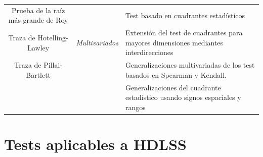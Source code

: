 \documentclass[]{book}
\begin{document}
\begin{longtable}[]{@{}ccl@{}}
\begin{minipage}[t]{0.25\columnwidth}
Prueba de la raíz más grande de Roy\strut
\end{minipage} & \begin{minipage}[t]{0.10\columnwidth}\centering\strut
\strut
\end{minipage} & \begin{minipage}[t]{0.56\columnwidth}\raggedright\strut
Test basado en cuadrantes estadísticos\strut
\end{minipage}\tabularnewline
\begin{minipage}[t]{0.25\columnwidth}\centering\strut
Traza de Hotelling-Lawley\strut
\end{minipage} & \begin{minipage}[t]{0.10\columnwidth}\centering\strut
\emph{\emph{Multivariados}}\strut
\end{minipage} & \begin{minipage}[t]{0.56\columnwidth}\raggedright\strut
Extensión del test de cuadrantes para mayores dimensiones mediantes
interdirecciones\strut
\end{minipage}\tabularnewline
\begin{minipage}[t]{0.25\columnwidth}\centering\strut
Traza de Pillai-Bartlett\strut
\end{minipage} & \begin{minipage}[t]{0.10\columnwidth}\centering\strut
\strut
\end{minipage} & \begin{minipage}[t]{0.56\columnwidth}\raggedright\strut
Generalizaciones multivariadas de los test basados en Spearman y
Kendall.\strut
\end{minipage}\tabularnewline
\begin{minipage}[t]{0.25\columnwidth}\centering\strut
\strut
\end{minipage} & \begin{minipage}[t]{0.10\columnwidth}\centering\strut
\strut
\end{minipage} & \begin{minipage}[t]{0.56\columnwidth}\raggedright\strut
Generalizaciones del cuadrante estadístico usando signos espaciales y
rangos\strut
\end{minipage}\tabularnewline
\bottomrule
\end{longtable}

\section{Tests aplicables a HDLSS}\label{tests-aplicables-a-hdlss}
\end{document}
